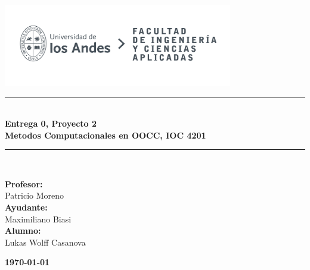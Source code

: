 \documentclass{article}  %
\begin{document}
\begin{titlepage}%
\newcommand{\HRule}{\rule{\linewidth}{0.5mm}} 
\center 
\includegraphics[width=10cm]{LOGO_UNIVERSIDAD.jpg}\\ %
\vspace{3cm}
\HRule \\[0.4cm]
{ \huge \bfseries Entrega 0, Proyecto 2}\\[0.4cm] %
{ \huge \bfseries Metodos Computacionales en OOCC, IOC 4201}\\[0.4cm] %
\HRule \\[1.5cm]
 \vspace{5.5cm}
\begin{flushright}
    { \textbf{Profesor:}\\
    Patricio Moreno\\
    \vspace{0.2cm}
    \textbf{Ayudante:} \\
    Maximiliano Biasi\\
    \vspace{0.2cm}
    \textbf{Alumno:} \\
    Lukas Wolff Casanova\\
}
\end{flushright}
\vspace{1cm}
{\large \textbf{\today}}\\[2cm] %
\end{titlepage}
\end{document}
